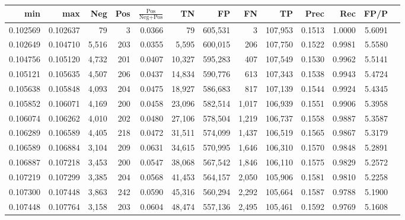 \begin{tabular}{rrrrrrrrrrrrr}
\toprule
     min &      max &   Neg & Pos & $\frac{\text{Pos}}{\text{Neg}+\text{Pos}}$ &      TN &      FP &      FN &      TP &   Prec &    Rec &   FP/P \\
\midrule
0.102569 & 0.102637 &    79 &   3 &                                     0.0366 &      79 & 605,531 &       3 & 107,953 & 0.1513 & 1.0000 & 5.6091 \\
0.102649 & 0.104710 & 5,516 & 203 &                                     0.0355 &   5,595 & 600,015 &     206 & 107,750 & 0.1522 & 0.9981 & 5.5580 \\
0.104756 & 0.105120 & 4,732 & 201 &                                     0.0407 &  10,327 & 595,283 &     407 & 107,549 & 0.1530 & 0.9962 & 5.5141 \\
0.105121 & 0.105635 & 4,507 & 206 &                                     0.0437 &  14,834 & 590,776 &     613 & 107,343 & 0.1538 & 0.9943 & 5.4724 \\
0.105638 & 0.105848 & 4,093 & 204 &                                     0.0475 &  18,927 & 586,683 &     817 & 107,139 & 0.1544 & 0.9924 & 5.4345 \\
0.105852 & 0.106071 & 4,169 & 200 &                                     0.0458 &  23,096 & 582,514 &   1,017 & 106,939 & 0.1551 & 0.9906 & 5.3958 \\
0.106074 & 0.106262 & 4,010 & 202 &                                     0.0480 &  27,106 & 578,504 &   1,219 & 106,737 & 0.1558 & 0.9887 & 5.3587 \\
0.106289 & 0.106589 & 4,405 & 218 &                                     0.0472 &  31,511 & 574,099 &   1,437 & 106,519 & 0.1565 & 0.9867 & 5.3179 \\
0.106589 & 0.106884 & 3,104 & 209 &                                     0.0631 &  34,615 & 570,995 &   1,646 & 106,310 & 0.1570 & 0.9848 & 5.2891 \\
0.106887 & 0.107218 & 3,453 & 200 &                                     0.0547 &  38,068 & 567,542 &   1,846 & 106,110 & 0.1575 & 0.9829 & 5.2572 \\
0.107219 & 0.107299 & 3,385 & 204 &                                     0.0568 &  41,453 & 564,157 &   2,050 & 105,906 & 0.1581 & 0.9810 & 5.2258 \\
0.107300 & 0.107448 & 3,863 & 242 &                                     0.0590 &  45,316 & 560,294 &   2,292 & 105,664 & 0.1587 & 0.9788 & 5.1900 \\
0.107448 & 0.107764 & 3,158 & 203 &                                     0.0604 &  48,474 & 557,136 &   2,495 & 105,461 & 0.1592 & 0.9769 & 5.1608 \\

\end{tabular}
